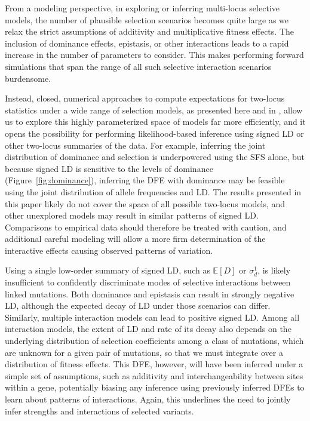 \documentclass[]{article}
\newcommand{\E}{\mathbb{E}}
\begin{document}
From a modeling perspective, in exploring or inferring multi-locus selective
models, the number of plausible selection scenarios becomes quite large as we
relax the strict assumptions of additivity and multiplicative fitness effects.
The inclusion of dominance effects, epistasis, or other interactions leads to a
rapid increase in the number of parameters to consider. This makes performing
forward simulations that span the range of all such selective interaction
scenarios burdensome. 

Instead, closed, numerical approaches to compute expectations for two-locus
statistics under a wide range of selection models, as presented here and in
\citet{Friedlander2022-bs}, allow us to explore this highly parameterized space
of models far more efficiently, and it opens the possibility for performing
likelihood-based inference using signed LD or other two-locus summaries of the
data. For example, inferring the joint distribution of dominance and selection
is underpowered using the SFS alone, but because signed LD is sensitive to the
levels of dominance (Figure~\ref{fig:dominance}), inferring the DFE with
dominance may be feasible using the joint distribution of allele frequencies
and LD. The results presented in this paper likely do not cover the space of
all possible two-locus models, and other unexplored models may result in
similar patterns of signed LD. Comparisons to empirical data should therefore
be treated with caution, and additional careful modeling will allow a more firm
determination of the interactive effects causing observed patterns of
variation.

Using a single low-order summary of signed LD, such as \(\E[D]\) or
\(\sigma_d^1\), is likely insufficient to confidently discriminate modes of
selective interactions between linked mutations. Both dominance and epistasis
can result in strongly negative LD, although the expected decay of LD under
those scenarios can differ. Similarly, multiple interaction models can lead to
positive signed LD. Among all interaction models, the extent of LD and rate of
its decay also depends on the underlying distribution of selection coefficients
among a class of mutations, which are unknown for a given pair of mutations, so
that we must integrate over a distribution of fitness effects. This DFE,
however, will have been inferred under a simple set of assumptions, such as
additivity and interchangeability between sites within a gene, potentially
biasing any inference using previously inferred DFEs to learn about patterns of
interactions. Again, this underlines the need to jointly infer strengths and
interactions of selected variants.
\end{document}
